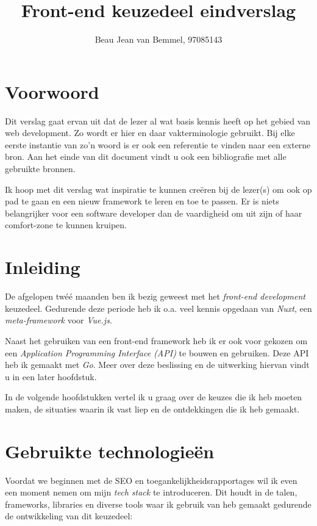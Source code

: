 \documentclass[a4paper]{report}
\title{Front-end keuzedeel eindverslag}
\author{Beau Jean van Bemmel, 97085143}
\begin{document}
    \maketitle

    \chapter*{Voorwoord}
    Dit verslag gaat ervan uit dat de lezer al wat basis kennis heeft op het gebied van web development.
    Zo wordt er hier en daar vakterminologie gebruikt. Bij elke eerste instantie van zo'n woord is er ook een referentie te vinden naar een externe bron.
    Aan het einde van dit document vindt u ook een bibliografie met alle gebruikte bronnen.

    Ik hoop met dit verslag wat inspiratie te kunnen creëren bij de lezer(s) om ook op pad te gaan en een nieuw framework te leren en toe te passen.
    Er is niets belangrijker voor een software developer dan de vaardigheid om uit zijn of haar comfort-zone te kunnen kruipen.
    \tableofcontents

    \chapter{Inleiding}
    De afgelopen twéé maanden ben ik bezig geweest met het \textit{front-end development} keuzedeel.
    Gedurende deze periode heb ik o.a. veel kennis opgedaan van 
    \textit{Nuxt}, een 
    \textit{meta-framework} voor 
    \textit{Vue.js}.
    
    Naast het gebruiken van een front-end framework heb ik er ook voor gekozen om een \textit{Application Programming Interface (API)} te bouwen en gebruiken.
    Deze API heb ik gemaakt met \textit{Go}. Meer over deze beslissing en de uitwerking hiervan vindt u in een later hoofdstuk.

    In de volgende hoofdstukken vertel ik u graag over de keuzes die ik heb moeten maken, de situaties waarin ik vast liep en de ontdekkingen die ik heb gemaakt.

    \chapter{Gebruikte technologieën}
    Voordat we beginnen met de SEO en toegankelijkheidsrapportages wil ik even een moment nemen om mijn \textit{tech stack} te introduceren.
    Dit houdt in de talen, frameworks, libraries en diverse tools waar ik gebruik van heb gemaakt gedurende de ontwikkeling van dit keuzedeel:
\end{document}
